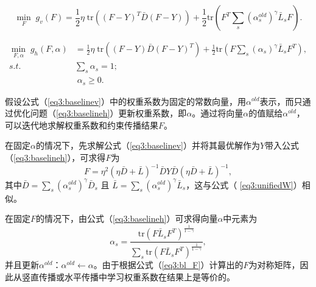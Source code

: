 \begin{equation}
\mathop{\mathrm{min}}_{{F}}\;g_v({F})=\frac{1}{2}\eta\;\mathrm{tr}(({F}-{Y})^T\bar{{D}}({F}-{Y}))+\frac{1}{2}\mathrm{tr}({F}^T \sum_s(\alpha_s^{old})^\gamma\bar{{L}}_s{F}).
\label{eq3:baselinev}
\end{equation}

\begin{equation}
\begin{split}
\mathop{\mathrm{min}}_{{F},{\alpha}}\;g_h({F},{\alpha})&=\frac{1}{2}\eta\;\mathrm{tr}(({F}-{Y})\bar{{D}}({F}-{Y})^T)+\frac{1}{2}\mathrm{tr}({F} \sum_s(\alpha_s)^\gamma\bar{{L}}_s{F}^T), \\
s.t.\quad\;& \sum_s \alpha_s = 1;\\ & \; \alpha_s \ge 0.
\end{split}
\label{eq3:baselineh}
\end{equation}

假设公式（\ref{eq3:baselinev}）中的权重系数为固定的常数向量，用$ {\alpha}^{old} $表示，而只通过优化问题（\ref{eq3:baselineh}）更新权重系数，即$\alpha$。通过将向量$\alpha$的值赋给$ {\alpha}^{old} $，可以迭代地求解权重系数和约束传播结果$F$。

在固定$\alpha$的情况下，先求解公式（\ref{eq3:baselinev}）并将其最优解作为$Y$带入公式（\ref{eq3:baselineh}），可求得$F$为
\begin{equation}
{F} = \eta^2(\eta\bar{{D}}+\bar{{L}})^{-1}\bar{{D}} {Y}\bar{{D}}(\eta\bar{{D}}+\bar{{L}})^{-1}, 
\label{eq3:bl_F}
\end{equation}
其中$\bar{{D}} = \sum_s (\alpha_s^{old})^\gamma  \bar{{D}}_s $ 且 $  \bar{{L}} = \sum_s (\alpha_s^{old})^\gamma  \bar{{L}}_s $，这与公式（ \ref{eq3:unifiedW}）相似。

在固定$F$的情况下，由公式（\ref{eq3:baselineh}）可求得向量$\alpha$中元素为
\begin{equation}
\alpha_s = \frac{\mathrm{tr}({F} \bar{{L}}_s{F}^T)^\frac{1}{1-\gamma}}{\sum_s \mathrm{tr}({F} \bar{{L}}_s{F}^T)^\frac{1}{1-\gamma}}, 
\end{equation}
并且更新${\alpha}^{old}$：$ {\alpha}^{old} \leftarrow {\alpha}$。由于根据公式（\ref{eq3:bl_F}）计算出的$F$为对称矩阵，因此从竖直传播或水平传播中学习权重系数在结果上是等价的。

